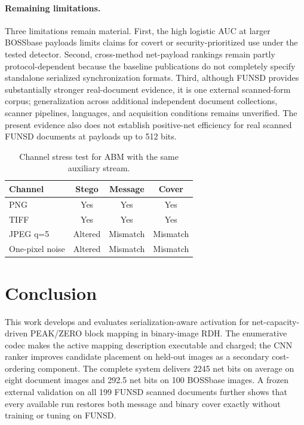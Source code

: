 \documentclass[a4paper,fleqn]{cas-dc}
\newcommand{\RevisionAddBegin}{\begingroup}
\newcommand{\RevisionAddEnd}{\endgroup}
\newcommand{\RevisionAddBegin}{\begingroup\color{revisionblue}}
\newcommand{\RevisionAddEnd}{\endgroup}
\begin{document}
\paragraph{Remaining limitations.}
Three limitations remain material. First, the high logistic AUC at larger
BOSSbase payloads limits claims for covert or security-prioritized use under the
tested detector. Second, cross-method net-payload rankings remain partly
protocol-dependent because the baseline publications do not completely specify
standalone serialized synchronization formats. Third, although FUNSD provides
substantially stronger real-document evidence, it is one external scanned-form
corpus; generalization across additional independent document collections,
scanner pipelines, languages, and acquisition conditions remains unverified.
The present evidence also does not establish positive-net efficiency for real
scanned FUNSD documents at payloads up to 512 bits.

\RevisionAddEnd

\begin{table}[t]
\centering
\caption{Channel stress test for ABM with the same auxiliary stream.}
\label{tab:channel-stress}
\begin{tabular}{@{}lccc@{}}
\toprule
\textbf{Channel} & \textbf{Stego} &
\textbf{Message} & \textbf{Cover} \\
\midrule
PNG & Yes & Yes & Yes \\
TIFF & Yes & Yes & Yes \\
JPEG q=5 & Altered & Mismatch & Mismatch \\
One-pixel noise & Altered & Mismatch & Mismatch \\
\bottomrule
\end{tabular}
\end{table}

\section{Conclusion}
\label{sec:conclusion}

\RevisionAddBegin
This work develops and evaluates serialization-aware activation for
net-capacity-driven PEAK/ZERO block mapping in binary-image RDH. The
enumerative codec makes the active mapping description executable and charged;
the CNN ranker improves candidate placement on held-out images as a secondary
cost-ordering component. The complete system delivers 2245 net bits on average
on eight document images and 292.5 net bits on 100 BOSSbase images. A frozen
external validation on all 199 FUNSD scanned documents further shows that every
available run restores both message and binary cover exactly without training
or tuning on FUNSD.
\end{document}
